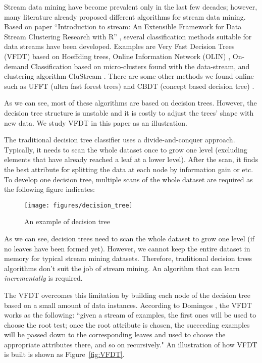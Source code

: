 \documentclass[conference]{IEEEtran}
\begin{document}
		Stream data mining have become prevalent only in the last few decades; however, many literature already proposed different algorithms for stream data mining. Based on paper ``Introduction to stream: An Extensible Framework for Data Stream Clustering Research with R'' \cite{Rstream}, several classification methods suitable for data streams have been developed. Examples are Very Fast Decision Trees (VFDT) \cite{VFDT} based on Hoeffding trees, Online Information Network (OLIN)  \cite{last}, On-demand Classification \cite{Aggarwal04} based on micro-clusters found with the data-stream, and clustering algorithm CluStream \cite{ggarwal03}. There are some other methods we found online such as UFFT (ultra fast forest trees) \cite{gama} and CBDT (concept based decision tree) \cite{CBDT}.  
		
		As we can see, most of these algorithms are based on decision trees. However, the decision tree structure is unstable and it is costly to adjust the trees' shape with new data. We study VFDT in this paper as an illustration.
		
		The traditional decision tree classifier uses a divide-and-conquer approach. Typically, it needs to scan the whole dataset once to grow one level (excluding elements that have already reached a leaf at a lower level). After the scan, it finds the best attribute for splitting the data at each node by information gain or etc. To develop one decision tree, multiple scans of the whole dataset are required as the following figure indicates:
		\begin{figure}[H]
			\centering
			\texttt{[image: figures/decision\_tree]}
			\caption{An example of decision tree}
			\label{fig:tree}
		\end{figure}
		
		As we can see, decision trees need to scan the whole dataset to grow one level (if no leaves have been formed yet). However, we cannot keep the entire dataset in memory for typical stream mining datasets. Therefore, traditional decision trees algorithms don't suit the job of stream mining. An algorithm that can learn \emph{incrementally} is required.
		
		The VFDT overcomes this limitation by building each node of the decision tree based on a small amount of data instances. According to Domingos \cite{VFDT}, the VFDT works as the following: ``given a stream of examples, the first ones will be used to choose the root test; once the root attribute is chosen, the succeeding examples will be passed down to the corresponding leaves and used to choose the appropriate attributes there, and so on recursively." An illustration of how VFDT is built is shown as Figure~\ref{fig:VFDT}.
		
\end{document}
